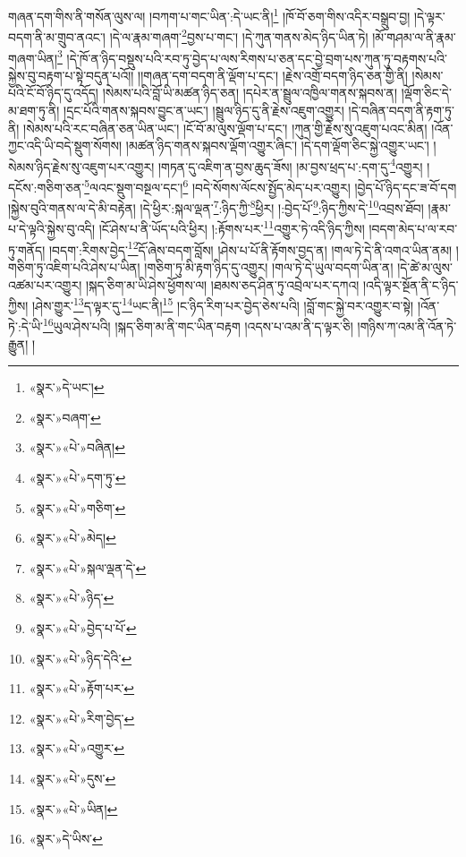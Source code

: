 གཞན་དག་གིས་ནི་གསོན་ལུས་ལ། །བཀག་པ་གང་ཡིན་:དེ་ཡང་ནི།\footnote{«སྣར་»དེ་ཡང་།} །ཁོ་བོ་ཅག་གིས་འདིར་བསྒྲུབ་བྱ། །དེ་ལྟར་བདག་ནི་མ་གྲུབ་ནའང་། །དེ་ལ་རྣམ་གཞག་\footnote{«སྣར་»བཞག་}བྱས་པ་གང་། །དེ་ཀུན་གནས་མེད་ཉིད་ཡིན་ཏེ། །མོ་གཤམ་ལ་ནི་རྣམ་གཞག་ཡིན།\footnote{«སྣར་»«པེ་»བཞིན།} །དེ་ཁོ་ན་ཉིད་བསྡུས་པའི་རབ་ཏུ་བྱེད་པ་ལས་རིགས་པ་ཅན་དང་བྱེ་བྲག་པས་ཀུན་ཏུ་བརྟགས་པའི་སྐྱེས་བུ་བརྟག་པ་སྟེ་བདུན་པའོ།། །།གཞན་དག་བདག་ནི་ལྡོག་པ་དང་། །རྗེས་འགྲོ་བདག་ཉིད་ཅན་གྱི་ནི། །སེམས་པའི་ངོ་བོ་ཉིད་དུ་འདོད། །སེམས་པའི་བློ་ཡི་མཚན་ཉིད་ཅན། །དཔེར་ན་སྦྲུལ་འཁྱིལ་གནས་སྐབས་ན། །ལྡོག་ཅིང་དེ་མ་ཐག་ཏུ་ནི། །དྲང་པོའི་གནས་སྐབས་བྱུང་ན་ཡང་། །སྦྲུལ་ཉིད་དུ་ནི་རྗེས་འཇུག་འགྱུར། །དེ་བཞིན་བདག་ནི་རྟག་ཏུ་ནི། །སེམས་པའི་རང་བཞིན་ཅན་ཡིན་ཡང་། །ངོ་བོ་མ་ལུས་ལྡོག་པ་དང་། །ཀུན་གྱི་རྗེས་སུ་འཇུག་པའང་མིན། །འོན་ཀྱང་འདི་ཡི་བདེ་སྡུག་སོགས། །མཚན་ཉིད་གནས་སྐབས་ལྡོག་འགྱུར་ཞིང་། །དེ་དག་ལྡོག་ཅིང་སྐྱེ་འགྱུར་ཡང་། །སེམས་ཉིད་རྗེས་སུ་འཇུག་པར་འགྱུར། །གཏན་དུ་འཇིག་ན་བྱས་ཆུད་ཟོས། །མ་བྱས་ཕྲད་པ་:དག་དུ་\footnote{«སྣར་»«པེ་»དག་ཏུ་}འགྱུར། །དངོས་:གཅིག་ཅན་\footnote{«སྣར་»«པེ་»གཅིག་}ལའང་སྡུག་བསྔལ་དང་།\footnote{«སྣར་»«པེ་»མེད།} །བདེ་སོགས་ལོངས་སྤྱོད་མེད་པར་འགྱུར། །བྱེད་པོ་ཉིད་དང་ཟ་བོ་དག །སྐྱེས་བུའི་གནས་ལ་དེ་མི་བརྟེན། །དེ་ཕྱིར་:སྐལ་ལྡན་\footnote{«སྣར་»«པེ་»སྐལ་ལྡན་དེ་}:ཉིད་ཀྱི་\footnote{«སྣར་»«པེ་»ཉིད་}ཕྱིར། །:བྱེད་པོ་\footnote{«སྣར་»«པེ་»བྱེད་པ་པོ་}:ཉིད་ཀྱིས་དེ་\footnote{«སྣར་»«པེ་»ཉིད་དེའི་}འབྲས་ཐོབ། །རྣམ་པ་དེ་ལྟའི་སྐྱེས་བུ་འདི། །ངོ་ཤེས་པ་ནི་ཡོད་པའི་ཕྱིར། །:རྟོགས་པར་\footnote{«སྣར་»«པེ་»རྟོག་པར་}འགྱུར་ཏེ་འདི་ཉིད་ཀྱིས། །བདག་མེད་པ་ལ་རབ་ཏུ་གནོད། །བདག་:རིགས་བྱེད་\footnote{«སྣར་»«པེ་»རིག་བྱེད་}དོ་ཞེས་བདག་བློས། །ཤེས་པ་པོ་ནི་རྟོགས་བྱད་ན། །གལ་ཏེ་དེ་ནི་འགའ་ཡིན་ནམ། །གཅིག་ཏུ་འཇིག་པའི་ཤེས་པ་ཡིན། །གཅིག་ཏུ་མི་རྟག་ཉིད་དུ་འགྱུར། །གལ་ཏེ་དེ་ཡུལ་བདག་ཡིན་ན། །དེ་ཚེ་མ་ལུས་འཚམ་པར་འགྱུར། །སྐད་ཅིག་མ་ཡི་ཤེས་ཕྱོགས་ལ། །ཐམས་ཅད་ཤིན་ཏུ་འབྲེལ་པར་དཀའ། །འདི་ལྟར་སྔོན་ནི་ང་ཉིད་ཀྱིས། །ཤེས་གྱུར་\footnote{«སྣར་»«པེ་»འགྱུར་}ད་ལྟར་དུ་\footnote{«སྣར་»«པེ་»དུས་}ཡང་ནི།\footnote{«སྣར་»«པེ་»ཡིན།} །ང་ཉིད་རིག་པར་བྱེད་ཅེས་པའི། །བློ་གང་སྐྱེ་བར་འགྱུར་བ་སྟེ། །འོན་ཏེ་:དེ་ཡི་\footnote{«སྣར་»དེ་ཡིས་}ཡུལ་ཤེས་པའི། །སྐད་ཅིག་མ་ནི་གང་ཡིན་བརྟག །འདས་པ་འམ་ནི་ད་ལྟར་ཅི། །གཉིས་ཀ་འམ་ནི་འོན་ཏེ་རྒྱུན། །
